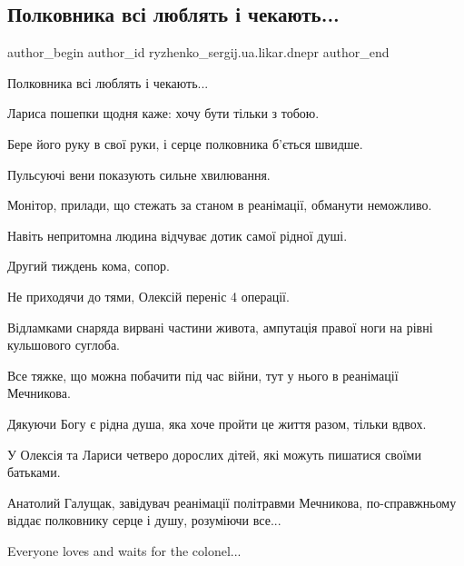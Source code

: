  
 
 
 
 

\subsection{Полковника всі люблять і чекають...}
\label{sec:05_01_2023.fb.ryzhenko_sergij.ua.likar.dnepr.1.polkovnika_vs__lyubl}

\ifcmt
 author_begin
   author_id ryzhenko_sergij.ua.likar.dnepr
 author_end
\fi

Полковника всі люблять і чекають...

Лариса пошепки щодня каже: хочу бути тільки з тобою.

Бере його руку в свої руки, і серце полковника б'ється швидше.

Пульсуючі вени показують сильне хвилювання.

Монітор, прилади, що стежать за станом  в реанімації, обманути неможливо.

Навіть непритомна людина відчуває дотик самої рідної душі.

Другий тиждень кома, сопор.

Не приходячи до тями, Олексій переніс 4 операції.

Відламками снаряда вирвані частини живота, ампутація правої ноги на рівні
кульшового суглоба.

Все тяжке, що можна побачити під час війни, тут у нього в реанімації Мечникова.

Дякуючи Богу є рідна душа, яка хоче пройти це життя разом, тільки вдвох.

У Олексія та Лариси четверо дорослих дітей, які можуть пишатися своїми
батьками.

Анатолий Галущак, завідувач реанімації політравми Мечникова, по-справжньому
віддає полковнику серце і душу, розуміючи все...

Everyone loves and waits for the colonel...

